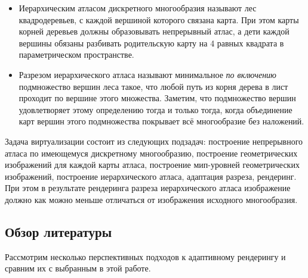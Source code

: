 \documentclass[12pt]{extarticle}
\begin{document}
\begin{itemize}
\item Иерархическим атласом \cite{niski2007multi} дискретного многообразия называют лес квадродеревьев, с каждой вершиной которого связана карта. При этом карты корней деревьев должны образовывать непрерывный атлас, а дети каждой вершины обязаны разбивать родительскую карту на 4 равных квадрата в параметрическом пространстве.
\item Разрезом иерархического атласа называют минимальное \emph{по включению} подмножество вершин леса такое, что любой путь из корня дерева в лист проходит по вершине этого множества. Заметим, что подмножество вершин удовлетворяет этому определению тогда и только тогда, когда объединение карт вершин этого подмножества покрывает всё многообразие без наложений.
\end{itemize}

Задача виртуализации состоит из следующих подзадач: построение непрерывного атласа по имеющемуся дискретному многообразию, построение геометрических изображений для каждой карты атласа, построение мип-уровней геометрических изображений, построение иерархического атласа, адаптация разреза, рендеринг. При этом в результате рендеринга разреза иерархического атласа изображение должно как можно меньше отличаться от изображения исходного многообразия.

\subsection{Обзор литературы}
\label{sec:related}
Рассмотрим несколько перспективных подходов к адаптивному рендерингу и сравним их с выбранным в этой работе.
\end{document}
